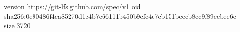 version https://git-lfs.github.com/spec/v1
oid sha256:0e90486f4ca85270d1c4b7c66111b450b9cfc4e7cb151beecb8cc9f89eebee6c
size 3720
